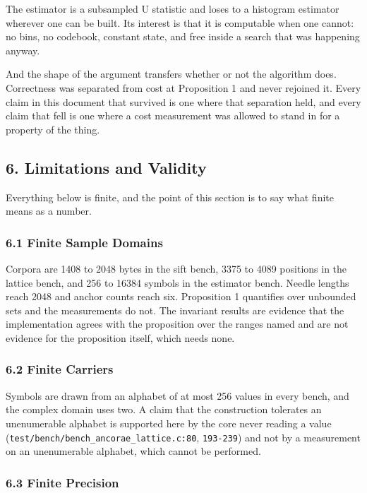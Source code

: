The estimator is a subsampled U statistic and loses to a histogram estimator wherever one can be built. Its interest is that it is computable when one cannot: no bins, no codebook, constant state, and free inside a search that was happening anyway.

And the shape of the argument transfers whether or not the algorithm does. Correctness was separated from cost at Proposition 1 and never rejoined it. Every claim in this document that survived is one where that separation held, and every claim that fell is one where a cost measurement was allowed to stand in for a property of the thing.

\subsection{6. Limitations and Validity}

Everything below is finite, and the point of this section is to say what finite means as a number.

\subsubsection{6.1 Finite Sample Domains}

Corpora are 1408 to 2048 bytes in the sift bench, 3375 to 4089 positions in the lattice bench, and 256 to 16384 symbols in the estimator bench. Needle lengths reach 2048 and anchor counts reach six. Proposition 1 quantifies over unbounded sets and the measurements do not. The invariant results are evidence that the implementation agrees with the proposition over the ranges named and are not evidence for the proposition itself, which needs none.

\subsubsection{6.2 Finite Carriers}

Symbols are drawn from an alphabet of at most 256 values in every bench, and the complex domain uses two. A claim that the construction tolerates an unenumerable alphabet is supported here by the core never reading a value (\texttt{test/\allowbreak{}bench/\allowbreak{}bench\_\allowbreak{}ancorae\_\allowbreak{}lattice.\allowbreak{}c:80}, \texttt{193-\allowbreak{}239}) and not by a measurement on an unenumerable alphabet, which cannot be performed.

\subsubsection{6.3 Finite Precision}


